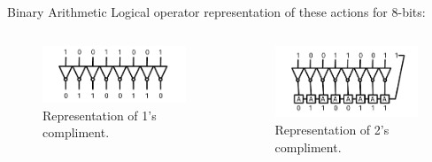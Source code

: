\documentclass{beamer}
\begin{document}
\begin{frame}{Binary Arithmetic}
Logical operator representation of these actions for 8-bits: \\ \vspace{0.5cm}
\hrulefill
\begin{columns}[T]
\begin{column}{0.5\textwidth}
\begin{figure}
\centering
\includegraphics[width=\textwidth]{figures/1Compliment.pdf}
\caption{\label{fig:1comp} Representation of 1's compliment.}
\end{figure}
\end{column}
\begin{column}{0.5\textwidth}
\begin{figure}
\centering
\includegraphics[width=\textwidth]{figures/2Compliment.pdf}
\caption{\label{fig:2comp} Representation of 2's compliment.}
\end{figure}
\end{column}
\end{columns}
\end{frame}
\end{document}
